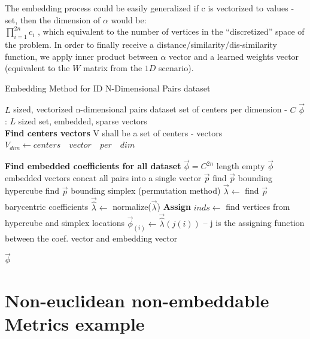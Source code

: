 	The embedding process could be easily generalized if c is vectorized to values - set, then the dimension of $\alpha$ would be:\\ 
	$\prod_{i=1}^{2n}c_i$ , which equivalent to the number of vertices in the “discretized” space of the problem.
	In order to finally receive a distance/similarity/dis-similarity function, we apply inner product between $\alpha$  vector and a learned weights vector (equivalent to the $W$ matrix from the $1D$ scenario).

	
	\begin{algorithm}
				\caption{Embedding Method for ID N-Dimensional Pairs dataset}
				\begin{algorithmic}
				 
				
				\REQUIRE $L$ sized, vectorized n-dimensional pairs dataset
				\REQUIRE set of centers per dimension - $C$
				\ENSURE $\overrightarrow{\phi}$: $L$ sized set, embedded, sparse vectors\\
				
				\STATE \textbf{Find centers vectors}
				\STATE V shall be a set of centers - vectors
				\STATE $V_{dim} \leftarrow centers \quad vector \quad per \quad dim$
				\ENDFOR
				
				\STATE \textbf{Find embedded coefficients for all dataset}
				\STATE $\overrightarrow{\phi} = C^{2n}$ length empty $\overrightarrow{\phi}$ embedded vectors
				\STATE concat all pairs into a single vector $\overrightarrow{p}$
				\STATE find $\overrightarrow{p}$ bounding hypercube 
				\STATE find $\overrightarrow{p}$ bounding simplex (permutation method)
				\STATE $\overrightarrow{\lambda} \leftarrow$ find $\overrightarrow{p}$ barycentric coefficients 
				\STATE $\overrightarrow{\hat{\lambda}} \leftarrow$ normalize($\overrightarrow{\lambda}$)
				\ENDFOR
				\STATE \textbf{Assign}
				\STATE $inds \leftarrow$ find vertices from hypercube and simplex locations
				\STATE $\overrightarrow{\phi}_{(i)} \leftarrow \overrightarrow{\hat{\lambda}}(j(i))$ -- j is the assigning function between the coef. vector and embedding vector
				\ENDFOR
				\ENDFOR
				
				\RETURN $\overrightarrow{\phi}$
	
				
				\end{algorithmic}
			\end{algorithm}
	
\break	
\section{Non-euclidean non-embeddable Metrics example}

